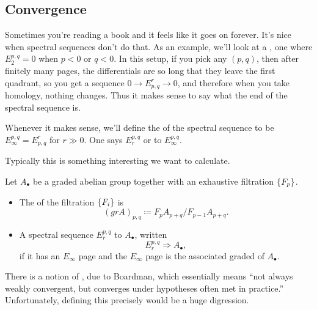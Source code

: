 \subsection*{Convergence}
Sometimes you're reading a book and it feels like it goes on forever. It's nice when spectral sequences don't do
that. As an example, we'll look at a , one where $E^{p,q}_2 = 0$ when $p <
0$ or $q < 0$. In this setup, if you pick any $(p,q)$, then after finitely many pages, the differentials are so
long that they leave the first quadrant, so you get a sequence $0\to E_{p,q}^r\to 0$, and therefore when you take
homology, nothing changes. Thus it makes sense to say what the end of the spectral sequence is.
\begin{defn}
Whenever it makes sense, we'll define the  of the spectral sequence to be $E_\infty^{p,q} =
E_{p,q}^r$ for $r\gg 0$. One says $E_r^{p,q}$  or  to $E_\infty^{p,q}$.
\end{defn}
Typically this is something interesting we want to calculate.
\begin{defn}
Let $A_\bullet$ be a graded abelian group together with an exhaustive filtration $\{F_p\}$.
\begin{itemize}
	\item The  of the filtration $\{F_i\}$ is
	\[(\mathit{gr} A)_{p,q}\coloneqq F_pA_{p+q}/F_{p-1}A_{p+q}.\]
	\item A spectral sequence $E_r^{p,q}$  to $A_\bullet$, written
	\[E_r^{p,q}\Longrightarrow A_\bullet,\]
	if it has an $E_\infty$ page and the $E_\infty$ page is the associated graded of $A_\bullet$.
\end{itemize}
\end{defn}
\begin{rem}
There is a notion of , due to Boardman, which essentially means ``not always weakly
convergent, but converges under hypotheses often met in practice.'' Unfortunately, defining this precisely would be
a huge digression.
\end{rem}


